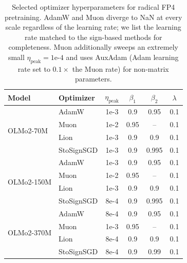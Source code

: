 \documentclass{article}
\begin{document}
\begin{table}[t]
\centering
\caption{Selected optimizer hyperparameters for radical FP4 pretraining. AdamW and Muon diverge to
NaN at every scale regardless of the learning rate; we list the learning rate matched to the
sign-based methods for completeness. Muon additionally sweeps an extremely small $\eta_\text{peak}=1$e-$4$
and uses AuxAdam (Adam learning rate set to $0.1\times$ the Muon rate) for non-matrix parameters.\label{tab:optimizer-hp-olmo}}
\begin{tabular}{llcccc}
\toprule
\textbf{Model} & \textbf{Optimizer} & $\eta_\text{peak}$ & $\beta_1$ & $\beta_2$ & $\lambda$ \\
\midrule
\multirow{4}{*}{OLMo2-70M}
 & AdamW      & 1e-3 & 0.9 & 0.95 & 0.1 \\
 & Muon       & 1e-2 & 0.95 & -- & 0.1 \\
 & Lion       & 1e-3 & 0.9 & 0.9  & 0.1 \\
 & \cellcolor{yellow!20}StoSignSGD & \cellcolor{yellow!20}1e-3 & \cellcolor{yellow!20}0.9 & \cellcolor{yellow!20}0.995 & \cellcolor{yellow!20}0.1 \\
\midrule
\multirow{4}{*}{OLMo2-150M}
 & AdamW      & 1e-3 & 0.9 & 0.95 & 0.1 \\
 & Muon       & 1e-2 & 0.95 & -- & 0.1 \\
 & Lion       & 1e-3 & 0.9 & 0.9  & 0.1 \\
 & \cellcolor{yellow!20}StoSignSGD & \cellcolor{yellow!20}8e-4 & \cellcolor{yellow!20}0.9 & \cellcolor{yellow!20}0.995 & \cellcolor{yellow!20}0.1 \\
\midrule
\multirow{4}{*}{OLMo2-370M}
 & AdamW      & 8e-4 & 0.9 & 0.95 & 0.1 \\
 & Muon       & 1e-3 & 0.95 & -- & 0.1 \\
 & Lion       & 8e-4 & 0.9 & 0.9  & 0.1 \\
 & \cellcolor{yellow!20}StoSignSGD & \cellcolor{yellow!20}8e-4 & \cellcolor{yellow!20}0.9 & \cellcolor{yellow!20}0.99 & \cellcolor{yellow!20}0.1 \\
\bottomrule
\end{tabular}
\end{table}
\end{document}
